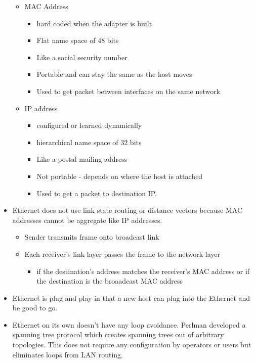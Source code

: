 \documentclass[]{article}
\providecommand{\tightlist}{%
  \setlength{\itemsep}{0pt}\setlength{\parskip}{0pt}}
\begin{document}
\begin{itemize}
  \begin{itemize}
  \tightlist
  \item
    MAC Address

    \begin{itemize}
    \tightlist
    \item
      hard coded when the adapter is built
    \item
      Flat name space of 48 bits
    \item
      Like a social security number
    \item
      Portable and can stay the same as the host moves
    \item
      Used to get packet between interfaces on the same network
    \end{itemize}
  \item
    IP address

    \begin{itemize}
    \tightlist
    \item
      configured or learned dynamically
    \item
      hierarchical name space of 32 bits
    \item
      Like a postal mailing address
    \item
      Not portable - depends on where the host is attached
    \item
      Used to get a packet to destination IP.
    \end{itemize}
  \end{itemize}
\item
  Ethernet does not use link state routing or distance vectors because
  MAC addresses cannot be aggregate like IP addresses.

  \begin{itemize}
  \tightlist
  \item
    Sender transmits frame onto broadcast link
  \item
    Each receiver's link layer passes the frame to the network layer

    \begin{itemize}
    \tightlist
    \item
      if the destination's address matches the receiver's MAC address or
      if the destination is the broaadcast MAC address
    \end{itemize}
  \end{itemize}
\item
  Ethernet is plug and play in that a new host can plug into the
  Ethernet and be good to go.
\item
  Ethernet on its own doesn't have any loop avoidance. Perlman developed
  a spanning tree protocol which creates spanning trees out of arbitrary
  topologies. This does not require any configuration by operators or
  users but eliminates loops from LAN routing.


\end{itemize}
\end{document}
